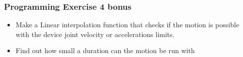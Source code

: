 \documentclass{beamer}
\begin{document}
\begin{frame}
  \frametitle{Programming Exercise 4 bonus}
  \begin{itemize}
  \item Make a Linear interpolation function that checks if the motion is possible with the device joint velocity or accelerations limits.
  \item Find out how small a duration can the motion be run with
  \end{itemize}
\end{frame}


\end{document}

